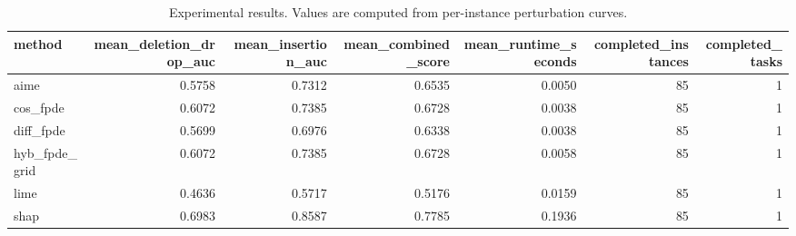 \begin{table}[t]
\caption{Experimental results. Values are computed from per-instance perturbation curves.}
\label{tab:main_results_computed}
\centering
\begin{tabular}{lrrrrrr}
\toprule
method & mean\_deletion\_drop\_auc & mean\_insertion\_auc & mean\_combined\_score & mean\_runtime\_seconds & completed\_instances & completed\_tasks \\
\midrule
aime & 0.5758 & 0.7312 & 0.6535 & 0.0050 & 85 & 1 \\
cos\_fpde & 0.6072 & 0.7385 & 0.6728 & 0.0038 & 85 & 1 \\
diff\_fpde & 0.5699 & 0.6976 & 0.6338 & 0.0038 & 85 & 1 \\
hyb\_fpde\_grid & 0.6072 & 0.7385 & 0.6728 & 0.0058 & 85 & 1 \\
lime & 0.4636 & 0.5717 & 0.5176 & 0.0159 & 85 & 1 \\
shap & 0.6983 & 0.8587 & 0.7785 & 0.1936 & 85 & 1 \\
\bottomrule
\end{tabular}

\end{table}
